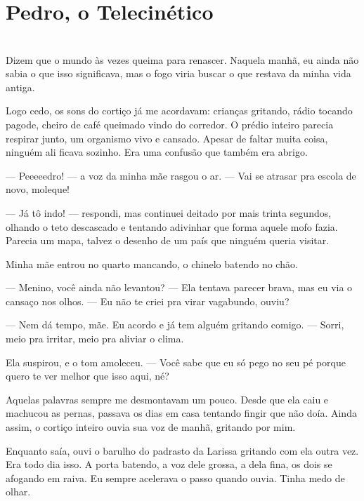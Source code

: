 \newpage

\ifdefined\useChapters
\chapter{Pedro, o Telecinético}
\else
\chapter{}
\fi

Dizem que o mundo às vezes queima para renascer.  
Naquela manhã, eu ainda não sabia o que isso significava, mas o fogo viria buscar o que restava da minha vida antiga.

Logo cedo, os sons do cortiço já me acordavam: crianças gritando, rádio tocando pagode, cheiro de café queimado vindo do corredor. O prédio inteiro parecia respirar junto, um organismo vivo e cansado. Apesar de faltar muita coisa, ninguém ali ficava sozinho. Era uma confusão que também era abrigo.

— Peeeeedro! — a voz da minha mãe rasgou o ar. — Vai se atrasar pra escola de novo, moleque!

— Já tô indo! — respondi, mas continuei deitado por mais trinta segundos, olhando o teto descascado e tentando adivinhar que forma aquele mofo fazia. Parecia um mapa, talvez o desenho de um país que ninguém queria visitar.

Minha mãe entrou no quarto mancando, o chinelo batendo no chão.

— Menino, você ainda não levantou? — Ela tentava parecer brava, mas eu via o cansaço nos olhos. — Eu não te criei pra virar vagabundo, ouviu?

— Nem dá tempo, mãe. Eu acordo e já tem alguém gritando comigo. — Sorri, meio pra irritar, meio pra aliviar o clima.

Ela suspirou, e o tom amoleceu.  
— Você sabe que eu só pego no seu pé porque quero te ver melhor que isso aqui, né?

Aquelas palavras sempre me desmontavam um pouco.  
Desde que ela caiu e machucou as pernas, passava os dias em casa tentando fingir que não doía. Ainda assim, o cortiço inteiro ouvia sua voz de manhã, gritando por mim.

Enquanto saía, ouvi o barulho do padrasto da Larissa gritando com ela outra vez. Era todo dia isso. A porta batendo, a voz dele grossa, a dela fina, os dois se afogando em raiva. Eu sempre acelerava o passo quando ouvia. Tinha medo de olhar.

